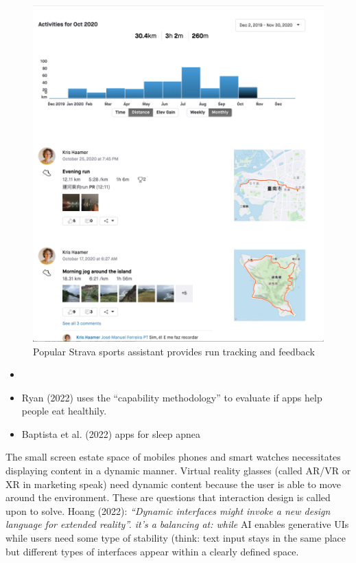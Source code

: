 \documentclass[
  letterpaper,
  DIV=11,
  numbers=noendperiod]{scrartcl}
\begin{document}
\begin{figure}[H]

{\centering \includegraphics[width=1\linewidth,height=\textheight,keepaspectratio]{./images/design/strava.png}

}

\caption{Popular Strava sports assistant provides run tracking and
feedback}

\end{figure}%

\begin{itemize}
\item
\item
  Ryan (2022) uses the ``capability methodology'' to evaluate if apps
  help people eat healthily.
\item
  Baptista et al. (2022) apps for sleep apnea
\end{itemize}

The small screen estate space of mobiles phones and smart watches
necessitates displaying content in a dynamic manner. Virtual reality
glasses (called AR/VR or XR in marketing speak) need dynamic content
because the user is able to move around the environment. These are
questions that interaction design is called upon to solve. Hoang (2022):
\emph{``Dynamic interfaces might invoke a new design language for
extended reality''. it's a balancing at: while} AI enables generative
UIs while users need some type of stability (think: text input stays in
the same place but different types of interfaces appear within a clearly
defined space.
\end{document}
